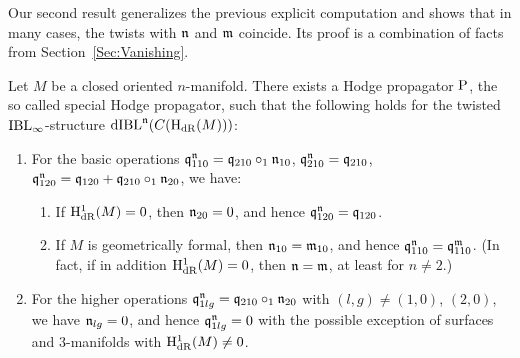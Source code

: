 \documentclass[\MainFolder/Text.tex]{subfiles}
\begin{document}

%

Our second result generalizes the previous explicit computation and shows that in many cases, the twists with $\mathfrak{n}$ and $\mathfrak{m}$ coincide. Its proof is a combination of facts from Section~\ref{Sec:Vanishing}.


\begin{IntroThm} \label{IntroThm:B}
Let $M$ be a closed oriented $n$-manifold. There exists a Hodge propagator $\mathrm{P}$, the so called special Hodge propagator, such that the following holds for the twisted $\mathrm{IBL}_\infty$-structure $\mathrm{dIBL}^{\mathfrak{n}}(C(\mathrm{H}_{\mathrm{dR}}(M)))$:
\begin{enumerate}[label=(\arabic*)]
\item For the basic operations $\mathfrak{q}_{110}^{\mathfrak{n}} = \mathfrak{q}_{210}\circ_1 \mathfrak{n}_{10}$, $\mathfrak{q}_{210}^{\mathfrak{n}} = \mathfrak{q}_{210}$, $\mathfrak{q}_{120}^{\mathfrak{n}} = \mathfrak{q}_{120} + \mathfrak{q}_{210}\circ_1 \mathfrak{n}_{20}$, we have:
\begin{enumerate}
\item If $\mathrm{H}_{\mathrm{dR}}^1(M)=0$, then $\mathfrak{n}_{20}=0$, and hence $\mathfrak{q}_{120}^{\mathfrak{n}} = \mathfrak{q}_{120}$.
\item If $M$ is geometrically formal, then $\mathfrak{n}_{10} = \mathfrak{m}_{10}$, and hence $\mathfrak{q}_{110}^{\mathfrak{n}} = \mathfrak{q}_{110}^{\mathfrak{m}}$. (In fact, if in addition $\mathrm{H}_{\mathrm{dR}}^1(M)=0$, then $\mathfrak{n} = \mathfrak{m}$, at least for $n\ne 2$.)
\end{enumerate}
\item For the higher operations $\mathfrak{q}_{1lg}^{\mathfrak{n}}=\mathfrak{q}_{210}\circ_1 \mathfrak{n}_{20}$ with $(l,g)\neq (1,0)$, $(2,0)$, we have $\mathfrak{n}_{lg}=0$, and hence $\mathfrak{q}_{1lg}^{\mathfrak{n}}=0$ with the possible exception of surfaces and $3$-manifolds with $\mathrm{H}_{\mathrm{dR}}^1(M)\neq 0$.
\end{enumerate}
\end{IntroThm}
\end{document}
